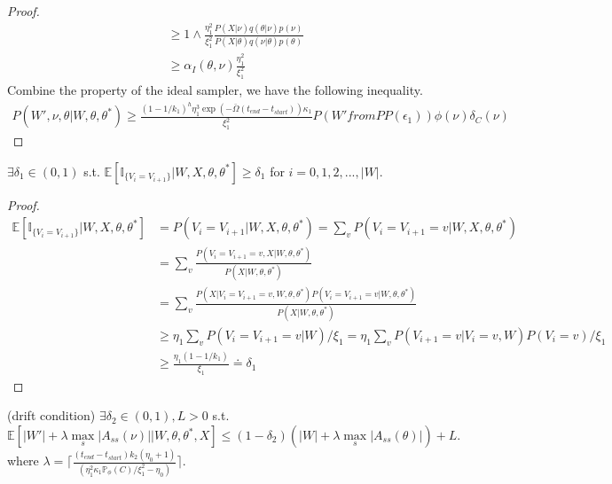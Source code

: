 \begin{proof}
\begin{align*}
& \geq 1 \wedge \frac{\eta_1^2}{\xi_1^2} 	\frac{P(X | \nu) q(\theta|\nu)p(\nu)}{P(X | \theta)q(\nu|\theta)p(\theta)}\\
& \geq \alpha_I(\theta, \nu)\frac{\eta_1^2}{\xi_1^2}
\end{align*}
Combine the property of the ideal sampler, we have the following inequality.
\begin{align*}
P(W', \nu, \theta | W, \theta, \theta^*) \geq \frac{(1 - 1/k_1)^{h} \eta_1^3 \exp(-\bar{\Omega}(t_{end} - t_{start}))\kappa_1}{\xi_1^2} P(W' from PP(\epsilon_1))\phi(\nu)\delta_C(\nu)
\end{align*}
\end{proof}

\begin{lemma}
$\exists \delta_1 \in (0, 1)$ s.t. $\mathbb{E}[\mathbb{I}_{\{V_i = V_{i + 1}\}} | W, X, \theta, \theta^*] \geq \delta_1$ for $i = 0, 1, 2, ..., |W|$. 
\end{lemma}
\begin{proof}
\begin{align*}
\mathbb{E}[\mathbb{I}_{\{V_i = V_{i + 1}\}} | W, X, \theta, \theta^*] &= P(V_i = V_{i + 1} | W, X, \theta, \theta^*) = \sum_v P(V_i = V_{i + 1} = v | W, X, \theta, \theta^*)\\
& =\sum_v \frac{P(V_i = V_{i + 1} = v, X | W, \theta, \theta^*)}{P(X | W, \theta, \theta^*)} \\
&=\sum_v \frac{P(X | V_i = V_{i + 1} = v, W, \theta, \theta^*)P( V_i = V_{i + 1} = v|W, \theta, \theta^*)}{P(X | W, \theta, \theta^*)}\\
& \geq \eta_1\sum_v P(V_i = V_{i + 1} = v | W) /\xi_1 =  \eta_1 \sum_v P(V_{i + 1} = v | V_i = v, W)P(V_i = v) /\xi_1 \\
& \geq \frac{\eta_1 (1 - 1/k_1)}{\xi_1} \doteq \delta_1 
\end{align*}
\end{proof}
\begin{theorem}(drift condition) $\exists \delta_2 \in (0, 1), L > 0$ s.t. $$\mathbb{E}[|W'| + \lambda \max_s |A_{ss}(\nu)| | W, \theta, \theta^*, X] \leq (1 - \delta_2)(|W| + \lambda \max_s |A_{ss}(\theta)|) + L.$$
where $\lambda = \lceil \frac{(t_{end} - t_{start})k_2(\eta_0 + 1)}{(\eta_1^2 \kappa_1 \mathbb{P}_\phi(C)/\xi_1^2 - \eta_0)} \rceil.$
\end{theorem}
